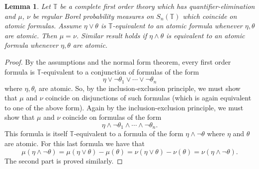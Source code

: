 \documentclass[12pt]{article}
\newtheorem{lemma}[theorem]{Lemma}
\begin{document}
\begin{lemma}\label{atomic values}
Let $\mathbb T$ be a complete first order theory which has quantifier-elimination and $\mu$, $\nu$
be regular Borel probability measures on $S_n(\mathbb{T})$ which coincide on atomic formulas.
Assume $\eta\vee\theta$ is $\mathbb{T}$-equivalent to an atomic formula whenever $\eta,\theta$ are atomic.
Then $\mu=\nu$. Similar result holds if $\eta\wedge\theta$ is equivalent to an atomic formula whenever $\eta,\theta$ are atomic.
\end{lemma}
\begin{proof}
By the assumptions and the normal form theorem, every first order formula is $\mathbb{T}$-equivalent
to a conjunction of formulas of the form $$\eta\vee\neg\theta_1\vee\cdots\vee\neg\theta_n$$
where $\eta,\theta_i$ are atomic. So, by the inclusion-exclusion principle, we must show that $\mu$ and $\nu$ coincide
on disjunctions of such formulas (which is again equivalent to one of the above form).
Again by the inclusion-exclusion principle, we must show that $\mu$ and $\nu$ coincide on formulas of the form
$$\eta\wedge\neg\theta_1\wedge\cdots\wedge\neg\theta_n.$$
This formula is itself $\mathbb{T}$-equivalent to a formula of the form $\eta\wedge\neg\theta$ where $\eta$ and $\theta$ are atomic.
For this last formula we have that
$$\mu(\eta\wedge\neg\theta)=\mu(\eta\vee\theta)-\mu(\theta)=\nu(\eta\vee\theta)-\nu(\theta)=\nu(\eta\wedge\neg\theta).$$
The second part is proved similarly.
\end{proof}
\end{document}
